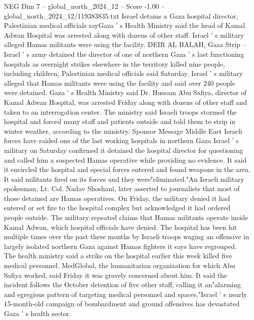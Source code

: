 \begin{textsample}{NEG Dim 7 – global\_north\_2024\_12 – Score -1.00 – global\_north\_2024\_12/119383835.txt}  \label{ex:f7_neg_161}
Israel detains a Gaza hospital director, Palestinian medical officials sayGaza ' s Health Ministry said the head of Kamal Adwan Hospital was arrested along with dozens of other staff.
Israel ' s military alleged Hamas militants were using the facility.
DEIR AL BALAH, Gaza Strip -- Israel ' s army detained the director of one of northern Gaza ' s last functioning hospitals as overnight strikes elsewhere in the territory killed nine people, including children, Palestinian medical officials said Saturday.
Israel ' s military alleged that Hamas militants were using the facility and said over 240 people were detained.
Gaza ' s Health Ministry said Dr.
Hussam Abu Safiya, director of Kamal Adwan Hospital, was arrested Friday along with dozens of other staff and taken to an interrogation center.
The ministry said Israeli troops stormed the hospital and forced many staff and patients outside and told them to strip in winter weather, according to the ministry.
Sponsor Message Middle East Israeli forces have raided one of the last working hospitals in northern Gaza Israel ' s military on Saturday confirmed it detained the hospital director for questioning and called him a suspected Hamas operative while providing no evidence.
It said it encircled the hospital and special forces entered and found weapons in the area.
It said militants fired on its forces and they were"eliminated."An Israeli military spokesman, Lt.
Col.
Nadav Shoshani, later asserted to journalists that most of those detained are Hamas operatives.
On Friday, the military denied it had entered or set fire to the hospital complex but acknowledged it had ordered people outside.
The military repeated claims that Hamas militants operate inside Kamal Adwan, which hospital officials have denied.
The hospital has been hit multiple times over the past three months by Israeli troops waging an offensive in largely isolated northern Gaza against Hamas fighters it says have regrouped.
The health ministry said a strike on the hospital earlier this week killed five medical personnel.
MedGlobal, the humanitarian organization for which Abu Safiya worked, said Friday it was gravely concerned about him.
It said the incident follows the October detention of five other staff, calling it an"alarming and egregious pattern of targeting medical personnel and spaces."Israel ' s nearly 15-month-old campaign of bombardment and ground offensives has devastated Gaza ' s health sector.

\end{textsample}
